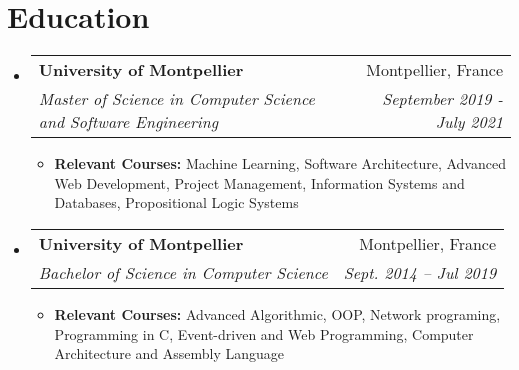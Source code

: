 \documentclass[letterpaper,11pt]{article}
\makeatletter
\newcommand{\resumeItem}[1]{\item\small{#1 \vspace{-2pt}}}
\newcommand{\resumeSubheading}[4]{
  \vspace{-2pt}\item
    \begin{tabular*}{0.97\textwidth}[t]{l@{\extracolsep{\fill}}r}
      \textbf{#1} & #2 \\
      \textit{\small#3} & \textit{\small #4} \\
    \end{tabular*}\vspace{-7pt}
}
\newcommand{\resumeSubHeadingListStart}{\begin{itemize}[leftmargin=0.15in, label={}]}
\newcommand{\resumeSubHeadingListEnd}{\end{itemize}}
\newcommand{\resumeItemListStart}{\begin{itemize}}
\newcommand{\resumeItemListEnd}{\end{itemize}\vspace{-5pt}}
\makeatother
\begin{document}


\section{Education}
  \resumeSubHeadingListStart
    \resumeSubheading
      {University of Montpellier}{Montpellier, France}
      {Master of Science in Computer Science and Software Engineering}{September 2019 - July 2021}
      \resumeItemListStart
      \resumeItem{\textbf{Relevant Courses:} Machine Learning, Software Architecture, Advanced Web Development, Project Management, Information Systems and Databases, Propositional Logic
Systems}
    \resumeItemListEnd
    \resumeSubheading
      {University of Montpellier}{Montpellier, France}
      {Bachelor of Science in Computer Science}{Sept. 2014 -- Jul 2019}
      \resumeItemListStart
      \resumeItem{\textbf{Relevant Courses:} Advanced Algorithmic, OOP, Network programing, Programming in C, Event-driven and Web Programming, Computer Architecture and Assembly Language}
    \resumeItemListEnd
  \resumeSubHeadingListEnd

\end{document}
